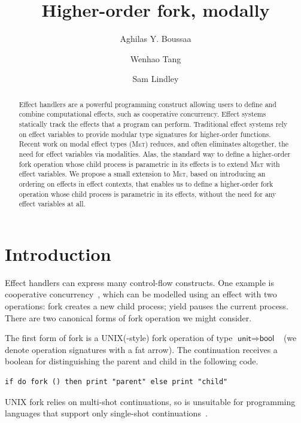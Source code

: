 \documentclass[sigplan, nonacm, natbib = false, review, screen]{acmart}
\title{Higher-order fork, modally}
\author{Aghilas Y. Boussaa}
\affiliation{%
  \institution{École normale supérieure -- PSL}
  \country{France}
}
\author{Wenhao Tang}
\affiliation{%
  \institution{The University of Edinburgh}
  \country{UK}
}
\author{Sam Lindley}
\affiliation{%
  \institution{The University of Edinburgh}
  \country{UK}}
\newcommand{\Met}{\textsc{Met}\xspace}
\begin{document}
\sloppy
\begin{abstract}
  Effect handlers are a powerful programming construct allowing users
  to define and combine computational effects, such as cooperative
  concurrency.
%
  Effect systems statically track the effects that a program can
  perform.
%
  Traditional effect systems rely on effect variables to provide
  modular type signatures for higher-order functions. Recent work on
  modal effect types (\Met) reduces, and often eliminates altogether,
  the need for effect variables via modalities.
%
  Alas, the standard way to define a higher-order fork operation whose
  child process is parametric in its effects is to extend \Met with
  effect variables.
%
  We propose a small extension to \Met, based on introducing an
  ordering on effects in effect contexts, that enables us to define a
  higher-order fork operation whose child process is parametric in its
  effects, without the need for any effect variables at all.
\end{abstract}
\maketitle
\section{Introduction}
Effect handlers can express many control-flow constructs. One example
is cooperative concurrency~\cite{structuredasync2017}, which can be
modelled using an effect with two operations: \textsf{fork} creates a
new child process; \textsf{yield} pauses the current process.
%
%
There are two canonical forms of fork operation we might consider.

The first form of fork is a UNIX(-style) fork operation of type
$\textsf{unit} \Rightarrow
\textsf{bool}$~\cite{hillerstrom2021thesis} (we denote operation
signatures with a fat arrow).
%
The continuation receives a boolean for distinguishing the parent and
child in the following code.
\begin{lstlisting}[style=metl]
  if do fork () then print "parent" else print "child"
\end{lstlisting}
%
UNIX fork relies on multi-shot continuations, so is unsuitable for
programming languages that support only single-shot
continuations~\cite{ocamleffect2021, wasmeffect2023}.
\end{document}
